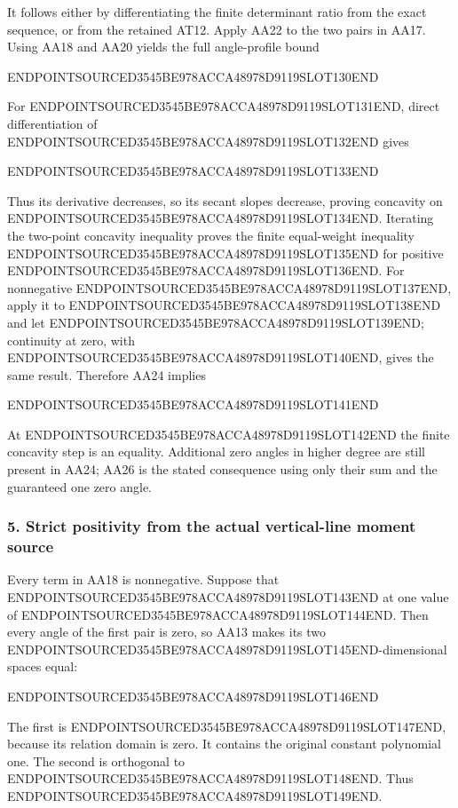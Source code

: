 It follows either by differentiating the finite determinant ratio from the exact sequence, or from the retained AT12. Apply AA22 to the two pairs in AA17. Using AA18 and AA20 yields the full angle-profile bound

ENDPOINTSOURCED3545BE978ACCA48978D9119SLOT130END

For ENDPOINTSOURCED3545BE978ACCA48978D9119SLOT131END, direct differentiation of ENDPOINTSOURCED3545BE978ACCA48978D9119SLOT132END gives

ENDPOINTSOURCED3545BE978ACCA48978D9119SLOT133END

Thus its derivative decreases, so its secant slopes decrease, proving concavity on ENDPOINTSOURCED3545BE978ACCA48978D9119SLOT134END. Iterating the two-point concavity inequality proves the finite equal-weight inequality ENDPOINTSOURCED3545BE978ACCA48978D9119SLOT135END for positive ENDPOINTSOURCED3545BE978ACCA48978D9119SLOT136END. For nonnegative ENDPOINTSOURCED3545BE978ACCA48978D9119SLOT137END, apply it to ENDPOINTSOURCED3545BE978ACCA48978D9119SLOT138END and let ENDPOINTSOURCED3545BE978ACCA48978D9119SLOT139END; continuity at zero, with ENDPOINTSOURCED3545BE978ACCA48978D9119SLOT140END, gives the same result. Therefore AA24 implies

ENDPOINTSOURCED3545BE978ACCA48978D9119SLOT141END

At ENDPOINTSOURCED3545BE978ACCA48978D9119SLOT142END the finite concavity step is an equality. Additional zero angles in higher degree are still present in AA24; AA26 is the stated consequence using only their sum and the guaranteed one zero angle.

\subsubsection{5. Strict positivity from the actual vertical-line moment source}\label{endpoint-all_degree_angle_review--strict-positivity-from-the-actual-vertical-line-moment-source}

Every term in AA18 is nonnegative. Suppose that ENDPOINTSOURCED3545BE978ACCA48978D9119SLOT143END at one value of ENDPOINTSOURCED3545BE978ACCA48978D9119SLOT144END. Then every angle of the first pair is zero, so AA13 makes its two ENDPOINTSOURCED3545BE978ACCA48978D9119SLOT145END-dimensional spaces equal:

ENDPOINTSOURCED3545BE978ACCA48978D9119SLOT146END

The first is ENDPOINTSOURCED3545BE978ACCA48978D9119SLOT147END, because its relation domain is zero. It contains the original constant polynomial one. The second is orthogonal to ENDPOINTSOURCED3545BE978ACCA48978D9119SLOT148END. Thus ENDPOINTSOURCED3545BE978ACCA48978D9119SLOT149END.

